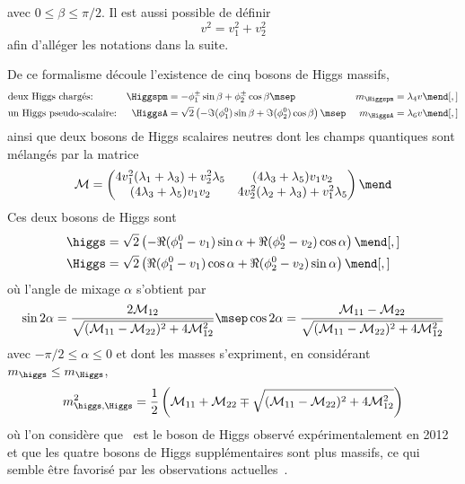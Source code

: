 avec $0\leq\beta\leq\pi/2$.
Il est aussi possible de définir
\begin{equation}
v^2 = v_1^2+v_2^2
\end{equation}
afin d'alléger les notations dans la suite.
\par De ce formalisme découle l'existence de cinq bosons de Higgs massifs,
\begin{align}
&
\text{deux Higgs chargés:}
&
\Higgspm &= - \phi_1^\pm \sin\beta + \phi_2^\pm \cos\beta
\msep&
m_{\Higgspm} &= \lambda_4 v
\mend[,]
\\
&
\text{un Higgs pseudo-scalaire:}
&
\HiggsA &= \sqrt{2}\left(-\Im(\phi_1^0)\sin\beta+\Im(\phi_2^0)\cos\beta\right)
\msep&
m_{\HiggsA} &= \lambda_6 v
\mend[,]
\end{align}
ainsi que deux bosons de Higgs scalaires neutres dont les champs quantiques sont mélangés par la matrice
\begin{equation}
\mathcal{M} = \begin{pmatrix}
4v_1^2 (\lambda_1+\lambda_3) + v_2^2\lambda_5 & (4\lambda_3+\lambda_5)v_1v_2 \\
(4\lambda_3+\lambda_5)v_1v_2 & 4v_2^2 (\lambda_2+\lambda_3) + v_1^2\lambda_5
\end{pmatrix}
\mend
\end{equation}
Ces deux bosons de Higgs sont
\begin{align}
\higgs &= \sqrt{2}\left(-\Re(\phi_1^0-v_1)\sin\alpha+\Re(\phi_2^0-v_2)\cos\alpha\right)
\mend[,]
\\
\Higgs &= \sqrt{2}\left(\Re(\phi_1^0-v_1)\cos\alpha+\Re(\phi_2^0-v_2)\sin\alpha\right)
\mend[,]
\end{align}
où l'angle de mixage $\alpha$ s'obtient par
\begin{equation}
\sin 2\alpha = \frac{2\mathcal{M}_{12}}{\sqrt{(\mathcal{M}_{11}-\mathcal{M}_{22})^2+4\mathcal{M}_{12}^2}}
\msep
\cos 2\alpha = \frac{\mathcal{M}_{11}-\mathcal{M}_{22}}{\sqrt{(\mathcal{M}_{11}-\mathcal{M}_{22})^2+4\mathcal{M}_{12}^2}}
\end{equation}
avec $-\pi/2\leq\alpha\leq0$
et
dont les masses s'expriment, en considérant $m_{\higgs} \leq m_{\Higgs}$,
\begin{equation}
m_{\higgs,\Higgs}^2 = \frac{1}{2} \left( \mathcal{M}_{11} + \mathcal{M}_{22} \mp \sqrt{(\mathcal{M}_{11}-\mathcal{M}_{22})^2+4\mathcal{M}_{12}^2} \right)
\end{equation}
où l'on considère que \higgs\ est le boson de Higgs observé expérimentalement en 2012~\cite{ATLAS_Higgs_discovery,CMS_Higgs_discovery,CMS_Higgs_discovery_2013,ATLAS-CMS-Higgs_combined_1,ATLAS-CMS-Higgs_combined_2} et que les quatre bosons de Higgs supplémentaires sont plus massifs, ce qui semble être favorisé par les observations actuelles~\cite{ATLAS-CMS-Higgs_combined_1,ATLAS-CMS-Higgs_combined_2,CMS-MSSM-HTT_2014}.
